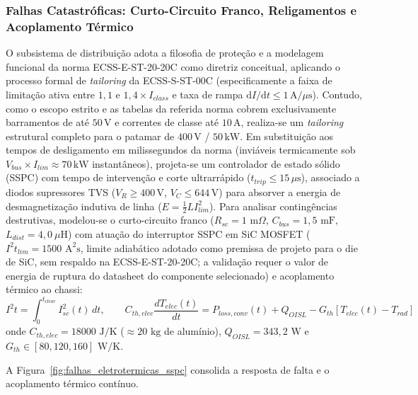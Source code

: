 \subsubsection{Falhas Catastróficas: Curto-Circuito Franco, Religamentos e Acoplamento Térmico}

O subsistema de distribuição adota a filosofia de proteção e a modelagem funcional da norma ECSS-E-ST-20-20C como diretriz conceitual, aplicando o processo formal de \textit{tailoring} da ECSS-S-ST-00C (especificamente a faixa de limitação ativa entre $1{,}1$ e $1{,}4 \times I_{class}$ e taxa de rampa $\mathrm{d}I/\mathrm{d}t \le 1\,\mathrm{A}/\mu\mathrm{s}$). Contudo, como o escopo estrito e as tabelas da referida norma cobrem exclusivamente barramentos de até $50\,\mathrm{V}$ e correntes de classe até $10\,\mathrm{A}$, realiza-se um \textit{tailoring} estrutural completo para o patamar de $400\,\mathrm{V}$ / $50\,\mathrm{kW}$. Em substituição aos tempos de desligamento em milissegundos da norma (inviáveis termicamente sob $V_{bus} \times I_{lim} \approx 70\,\mathrm{kW}$ instantâneos), projeta-se um controlador de estado sólido (SSPC) com tempo de intervenção e corte ultrarrápido ($t_{trip} \le 15\,\mu\mathrm{s}$), associado a diodos supressores TVS ($V_R \ge 400\,\mathrm{V}$, $V_C \le 644\,\mathrm{V}$) para absorver a energia de desmagnetização indutiva de linha ($E = \frac{1}{2} L I_{lim}^2$). Para analisar contingências destrutivas, modelou-se o curto-circuito franco ($R_{sc} = 1\text{ m}\Omega$, $C_{bus} = 1{,}5\text{ mF}$, $L_{dist} = 4{,}0\ \mu\text{H}$) com atuação do interruptor SSPC em SiC MOSFET ($I^2t_{lim} = 1500\text{ A}^2\text{s}$, limite adiabático adotado como premissa de projeto para o die de SiC, sem respaldo na ECSS-E-ST-20-20C; a validação requer o valor de energia de ruptura do datasheet do componente selecionado) e acoplamento térmico ao chassi:
\begin{equation}
    I^2t = \int_0^{t_{clear}} I_{sc}^2(t) \, dt, \qquad C_{th,elec} \frac{dT_{elec}(t)}{dt} = P_{loss,conv}(t) + Q_{OISL} - G_{th} \left[ T_{elec}(t) - T_{rad} \right]
    \label{eq:curto_termico_acoplado}
\end{equation}
onde $C_{th,elec} = 18000\text{ J/K}$ ($\approx 20\text{ kg}$ de alumínio), $Q_{OISL} = 343{,}2\text{ W}$ e $G_{th} \in [80, 120, 160]\text{ W/K}$.

A Figura~\ref{fig:falhas_eletrotermicas_sspc} consolida a resposta de falta e o acoplamento térmico contínuo.

